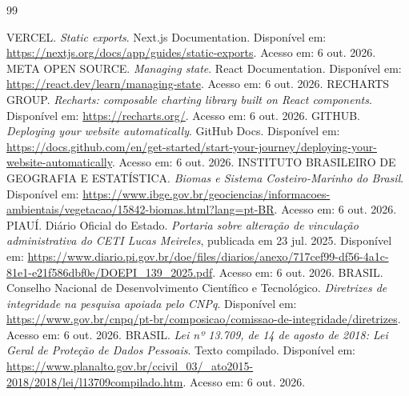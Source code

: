 \documentclass[12pt,oneside,a4paper,brazil]{abntex2}
\begin{document}
\postextual
\begin{thebibliography}{99}

 VERCEL. \textit{Static exports}. Next.js Documentation. Disponível em: \url{https://nextjs.org/docs/app/guides/static-exports}. Acesso em: 6 out. 2026.
 META OPEN SOURCE. \textit{Managing state}. React Documentation. Disponível em: \url{https://react.dev/learn/managing-state}. Acesso em: 6 out. 2026.
 RECHARTS GROUP. \textit{Recharts: composable charting library built on React components}. Disponível em: \url{https://recharts.org/}. Acesso em: 6 out. 2026.
 GITHUB. \textit{Deploying your website automatically}. GitHub Docs. Disponível em: \url{https://docs.github.com/en/get-started/start-your-journey/deploying-your-website-automatically}. Acesso em: 6 out. 2026.
 INSTITUTO BRASILEIRO DE GEOGRAFIA E ESTATÍSTICA. \textit{Biomas e Sistema Costeiro-Marinho do Brasil}. Disponível em: \url{https://www.ibge.gov.br/geociencias/informacoes-ambientais/vegetacao/15842-biomas.html?lang=pt-BR}. Acesso em: 6 out. 2026.
 PIAUÍ. Diário Oficial do Estado. \textit{Portaria sobre alteração de vinculação administrativa do CETI Lucas Meireles}, publicada em 23 jul. 2025. Disponível em: \url{https://www.diario.pi.gov.br/doe/files/diarios/anexo/717cef99-df56-4a1c-81e1-e21f586dbf0e/DOEPI_139_2025.pdf}. Acesso em: 6 out. 2026.
 BRASIL. Conselho Nacional de Desenvolvimento Científico e Tecnológico. \textit{Diretrizes de integridade na pesquisa apoiada pelo CNPq}. Disponível em: \url{https://www.gov.br/cnpq/pt-br/composicao/comissao-de-integridade/diretrizes}. Acesso em: 6 out. 2026.
 BRASIL. \textit{Lei nº 13.709, de 14 de agosto de 2018: Lei Geral de Proteção de Dados Pessoais}. Texto compilado. Disponível em: \url{https://www.planalto.gov.br/ccivil_03/_ato2015-2018/2018/lei/l13709compilado.htm}. Acesso em: 6 out. 2026.
\end{thebibliography}
\end{document}
